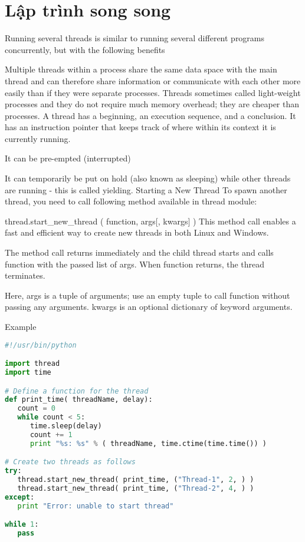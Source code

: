 \section{Lập trình song song}

Running several threads is similar to running several different programs concurrently, but with the following benefits

Multiple threads within a process share the same data space with the main thread and can therefore share information or communicate with each other more easily than if they were separate processes.
Threads sometimes called light-weight processes and they do not require much memory overhead; they are cheaper than processes.
A thread has a beginning, an execution sequence, and a conclusion. It has an instruction pointer that keeps track of where within its context it is currently running.

It can be pre-empted (interrupted)

It can temporarily be put on hold (also known as sleeping) while other threads are running - this is called yielding.
Starting a New Thread
To spawn another thread, you need to call following method available in thread module:

thread.start_new_thread ( function, args[, kwargs] )
This method call enables a fast and efficient way to create new threads in both Linux and Windows.

The method call returns immediately and the child thread starts and calls function with the passed list of args. When function returns, the thread terminates.

Here, args is a tuple of arguments; use an empty tuple to call function without passing any arguments. kwargs is an optional dictionary of keyword arguments.

Example

\begin{lstlisting}[language=Python]
#!/usr/bin/python

import thread
import time

# Define a function for the thread
def print_time( threadName, delay):
   count = 0
   while count < 5:
      time.sleep(delay)
      count += 1
      print "%s: %s" % ( threadName, time.ctime(time.time()) )

# Create two threads as follows
try:
   thread.start_new_thread( print_time, ("Thread-1", 2, ) )
   thread.start_new_thread( print_time, ("Thread-2", 4, ) )
except:
   print "Error: unable to start thread"

while 1:
   pass
\end{lstlisting}

